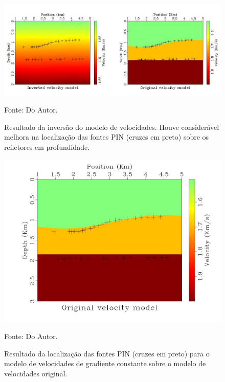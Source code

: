 \begin{figure}[H]
\caption{Resultado da inversão do modelo de velocidades. Houve considerável melhora na
localização das fontes PIN (cruzes em preto) sobre os refletores em profundidade.}
\begin{center}
\includegraphics[scale=2]{images/inverted-original.jpeg}
\vspace{-0.3cm}
\end{center}
\begin{center}
 Fonte: Do Autor.
\end{center}
\label{fig:5.2}
\end{figure}

\begin{figure}[H]
\caption{Resultado da localização das fontes PIN (cruzes em preto)
para o modelo de velocidades de gradiente constante sobre o modelo de velocidades original.}
\begin{center}
\includegraphics[scale=0.25]{images/gzvel.jpeg}
\vspace{-0.3cm}
\end{center}
\begin{center}
 Fonte: Do Autor.
\end{center}
\label{fig:5.3}
\end{figure}

